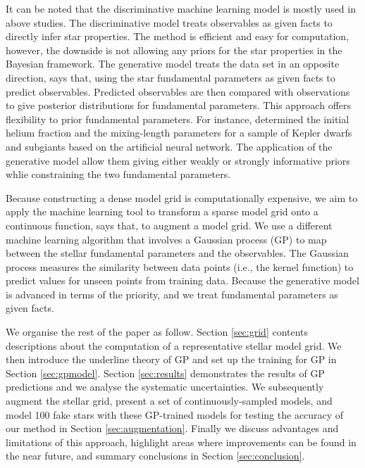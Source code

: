 %
It can be noted that the discriminative machine learning model is mostly used in above studies. The discriminative model treats observables as given facts to directly infer star properties. The method is efficient and easy for computation, however, the downside is not allowing any priors for the star properties in the Bayesian framework. 
%
The generative model treats the data set in an opposite direction, says that, using the star fundamental parameters as given facts to predict observables. Predicted observables are then compared with observations to give posterior distributions for fundamental parameters. This approach offers flexibility to prior fundamental parameters. For instance, \citet{2021MNRAS.tmp.1343L} determined the initial helium fraction and the mixing-length parameters for a sample of Kepler dwarfs and subgiants based on the artificial neural network. The application of the generative model allow them giving either weakly or strongly informative priors whlie constraining the two fundamental parameters. 

Because constructing a dense model grid is computationally expensive, we aim to apply the machine learning tool to transform a sparse model grid onto a continuous function, says that, to augment a model grid. We use a different machine learning algorithm that involves a Gaussian process (GP) to map between the stellar fundamental parameters and the observables. The Gaussian process measures the similarity between data points (i.e., the kernel function) to predict values for unseen points from training data. Because the generative model is advanced in terms of the priority, and we treat fundamental parameters as given facts. 

We organise the rest of the paper as follow. Section \ref{sec:grid} contents descriptions about the computation of a representative stellar model grid. We then introduce the underline theory of GP and set up the training for GP in Section \ref{sec:gpmodel}. Section \ref{sec:results} demonstrates the results of GP predictions and we analyse the systematic uncertainties. We subsequently augment the stellar grid,  present a set of continuously-sampled models, and model 100 fake stars with these GP-trained models for testing the accuracy of our method in Section \ref{sec:augmentation}. 
Finally we discuss advantages and limitations of this approach, highlight areas where improvements can be found in the near future, and summary conclusions in Section \ref{sec:conclusion}.


